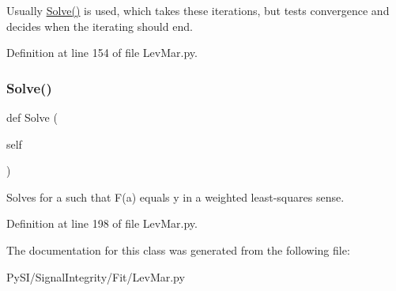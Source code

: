 Usually \hyperlink{classSignalIntegrity_1_1Fit_1_1LevMar_1_1LevMar_acfa2263d4f73bf98053a5a8ed10a4c41}{Solve()} is used, which takes these iterations, but tests convergence and decides when the iterating should end. 

Definition at line 154 of file Lev\+Mar.\+py.

\mbox{\label{classSignalIntegrity_1_1Fit_1_1LevMar_1_1LevMar_acfa2263d4f73bf98053a5a8ed10a4c41}} 
\subsubsection{\texorpdfstring{Solve()}{Solve()}}
{\footnotesize\ttfamily def Solve (\begin{DoxyParamCaption}\item[{}]{self }\end{DoxyParamCaption})}



Solves for a such that F(a) equals y in a weighted least-\/squares sense. 



Definition at line 198 of file Lev\+Mar.\+py.



The documentation for this class was generated from the following file\+:\begin{DoxyCompactItemize}
\item 
Py\+S\+I/\+Signal\+Integrity/\+Fit/Lev\+Mar.\+py\end{DoxyCompactItemize}
